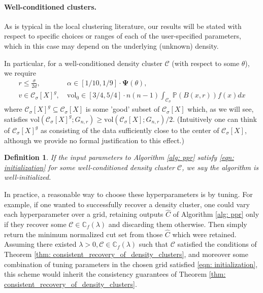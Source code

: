 \documentclass{article}
\newcommand{\vol}{\mathrm{vol}}
\newcommand{\1}{\mathbf{1}}
\newcommand{\Xbf}{X}             %
\newcommand{\Pbb}{\mathbb{P}}
\newcommand{\Cbb}{\mathbb{C}}
\newcommand{\Cset}{\mathcal{C}}
\newcommand{\Csig}{\Cset_{\sigma}}
\newcommand{\Cest}{\widehat{C}}
\theoremstyle{aldenthm}
\newtheorem{definition}{Definition}
\theoremstyle{aldenrmrk}
\begin{document}
\paragraph{Well-conditioned clusters.}

As is typical in the local clustering literature, our results will be stated with respect to specific choices or ranges of each of the user-specified parameters, which in this case may depend on the underlying (unknown) density. 

In particular, for a well-conditioned density cluster $\Cset$ (with respect to some $\theta$), we require
\begin{align}
\label{eqn: initialization}
r \leq \frac{\sigma}{2d}, & ~\alpha \in [1/10, 1/9] \cdot \mathbf{\Psi}(\theta) \nonumber,  \\
v \in \Csig[\Xbf]^g, & ~\vol_0 \in [3/4,5/4] \cdot n(n-1) \int_{\Csig} \Pbb(B(x,r)) f(x) dx
\end{align}
where $\Csig[\Xbf]^g \subseteq \Csig[\Xbf]$ is some 'good' subset of $\Csig[\Xbf]$ which, as we will see, satisfies $\vol(\Csig[\Xbf]^g; G_{n,r}) \geq \vol(\Csig[\Xbf]; G_{n,r})/2$. (Intuitively one can think of $\Csig[\Xbf]^g$ as consisting of the data sufficiently close to the center of $\Csig[\Xbf]$, although we provide no formal justification to this effect.)

\begin{definition}
	If the input parameters to Algorithm \ref{alg: ppr} satisfy \eqref{eqn: initialization} for some well-conditioned density cluster $\Cset$, we say the algorithm is \emph{well-initialized}.
\end{definition}


In practice, a reasonable way to choose these hyperparameters is by tuning. For example, if one wanted to successfully recover a density cluster, one could vary each hyperparameter over a grid, retaining outputs $\Cest$ of Algorithm \ref{alg: ppr} only if they recover some $\Cset \in \Cbb_f(\lambda)$ and discarding them otherwise. Then simply return the minimum normalized cut set from those $\Cest$ which were retained. Assuming there existed $\lambda > 0, \Cset \in \Cbb_f(\lambda)$ such that $\Cset$ satisfied the conditions of Theorem \ref{thm: consistent_recovery_of_density_clusters}, and moreover some combination of tuning parameters in the chosen grid satisfied \eqref{eqn: initialization}, this scheme would inherit the consistency guarantees of Theorem \ref{thm: consistent_recovery_of_density_clusters}.
\end{document}
